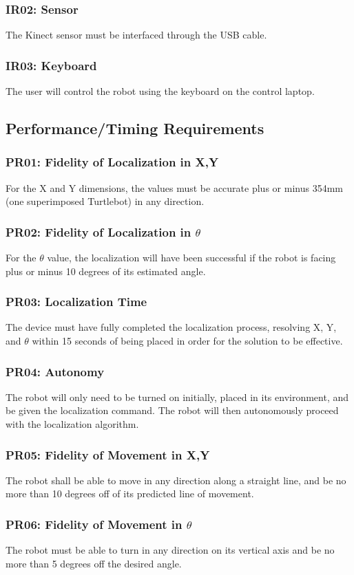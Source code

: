\documentclass{article}
\begin{document}
\subsubsection{IR02: Sensor}
The Kinect sensor must be interfaced through the USB cable.
\subsubsection{IR03: Keyboard}
The user will control the robot using the keyboard on the control  laptop.

\subsection{Performance/Timing Requirements}
\subsubsection{PR01: Fidelity of Localization in X,Y}
For the X and Y dimensions, the values must be accurate plus or minus 354mm (one superimposed Turtlebot) in any direction.
\subsubsection{PR02: Fidelity of Localization in \(\theta\)}
For the \(\theta\) value, the localization will have been successful if the robot is facing plus or minus 10 degrees of its estimated angle.
\subsubsection{PR03: Localization Time}
The device must have fully completed the localization process, resolving X, Y, and \(\theta\) within 15 seconds of being placed in order for the solution to be effective.
\subsubsection{PR04: Autonomy}
The robot will only need to be turned on initially, placed in its environment, and be given the localization command. The robot will then autonomously proceed with the localization algorithm. 
\subsubsection{PR05: Fidelity of Movement in X,Y}
The robot shall be able to move in any direction along a straight line, and be no more than 10 degrees off of its predicted line of movement.
\subsubsection{PR06: Fidelity of Movement in \(\theta\)}
The robot must be able to turn in any direction on its vertical axis and be no more than 5 degrees off the desired angle.
\end{document}
